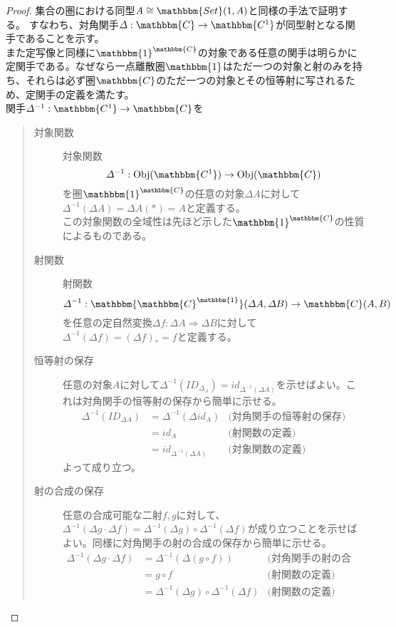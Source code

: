 \documentclass[uplatex,dvipdfmx]{jsarticle}
\newcommand{\cat}[1]{\mathbbm{#1}}
\newcommand{\arrow}{\rightarrow}
\newcommand{\functor}[3]{#1:\cat{#2}\arrow \cat{#3}}
\newcommand{\nat}[3]{#1:#2\Rightarrow #3}
\newcommand{\obj}[1]{\mathrm{Obj}(\cat{#1})}
\newcommand{\mor}[3]{#1:#2\arrow #3}
\newcommand{\arset}[3]{\cat{#1}(#2,#3)}
\newcommand{\funccat}[2]{\cat{#2}^\cat{#1}}
\newtheorem{proof}{証明}[section]
\numberwithin{proof}{subsection}
\numberwithin{prop}{subsection}
\numberwithin{define}{subsection}
\begin{document}
  \begin{proof}
    集合の圏における同型$A\cong\arset{Set}{1}{A}$と同様の手法で証明する。
    すなわち、対角関手$\functor{\varDelta}{C}{C^1}$が同型射となる関手であることを示す。\\
    また定写像と同様に$\funccat{C}{1}$の対象である任意の関手は明らかに定関手である。なぜなら一点離散圏$\cat{1}$はただ一つの対象と射のみを持ち、それらは必ず圏$\cat{C}$のただ一つの対象とその恒等射に写されるため、定関手の定義を満たす。\\
    関手$\functor{\varDelta^{-1}}{C^1}{C}$を
    \begin{quote}
			\begin{description}
				\item[対象関数]対象関数\[\mor{\varDelta^{-1}}{\obj{C^1}}{\obj{C}}\]を圏$\funccat{C}{1}$の任意の対象$\varDelta A$に対して$\varDelta^{-1}(\varDelta A)=\varDelta A(*)=A$と定義する。\\
        この対象関数の全域性は先ほど示した$\funccat{C}{1}$の性質によるものである。
				\item[射関数]射関数\[\mor{\varDelta^{-1}}{\arset{\funccat{1}{C}}{\varDelta A}{\varDelta B}}{\arset{C}{A}{B}}\]を任意の定自然変換$\nat{\varDelta f}{\varDelta A}{\varDelta B}$に対して$\varDelta^{-1}(\varDelta f) = (\varDelta f)_*=f$と定義する。
				\item[恒等射の保存]任意の対象$A$に対して$\varDelta^{-1}(ID_{\varDelta_A})=id_{\varDelta^{-1}(\varDelta A)}$を示せばよい。これは対角関手の恒等射の保存から簡単に示せる。
				\begin{align*}
          \varDelta^{-1}(ID_{\varDelta A})&=\varDelta^{-1}(\varDelta id_A)&\text{(対角関手の恒等射の保存)}\\
          &=id_A&\text{(射関数の定義)}\\
          &=id_{\varDelta^{-1}(\varDelta A)}&\text{(対象関数の定義)}
        \end{align*}
        よって成り立つ。
				\item[射の合成の保存]任意の合成可能な二射$f,g$に対して、$\varDelta^{-1}(\varDelta g\cdot\varDelta f)=\varDelta^{-1}(\varDelta g)\circ\varDelta^{-1}(\varDelta f)$が成り立つことを示せばよい。同様に対角関手の射の合成の保存から簡単に示せる。
				\begin{align*}
          \varDelta^{-1}(\varDelta g\cdot\varDelta f)&=\varDelta^{-1}(\varDelta(g\circ f))&\text{(対角関手の射の合成の保存)}\\
          &=g\circ f&\text{(射関数の定義)}\\
          &=\varDelta^{-1}(\varDelta g)\circ\varDelta^{-1}(\varDelta f)&\text{(射関数の定義)}

\end{align*}
\end{description}
\end{quote}
\end{proof}
\end{document}
